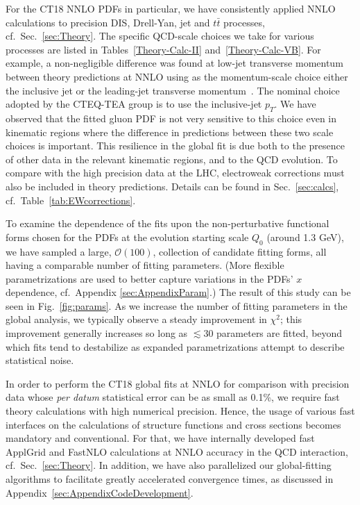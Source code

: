For the CT18 NNLO PDFs in particular, we have consistently applied NNLO calculations to precision DIS, Drell-Yan, jet and $t \bar t$ processes, cf.~Sec.~\ref{sec:Theory}. The specific QCD-scale choices
we take for various processes are listed in Tables~\ref{Theory-Calc-II} and~\ref{Theory-Calc-VB}.
%
%
For example, a non-negligible difference was found at low-jet transverse momentum between theory predictions at NNLO using as the momentum-scale choice either the inclusive jet or the
leading-jet transverse momentum~\cite{Currie:2018xkj}. The nominal choice adopted by the CTEQ-TEA group is to use the inclusive-jet $p_T$. 
We have observed that the fitted gluon PDF is not very sensitive to this choice even in kinematic regions where the difference in predictions between these two scale choices is important.
This resilience in the global fit is due both to the presence of other data in the relevant kinematic regions, and to the QCD evolution. To compare with the high precision data at the
LHC, electroweak corrections must also be included in theory predictions. Details can be found in Sec.~\ref{sec:calcs}, cf.~Table~\ref{tab:EWcorrections}.


To examine the dependence of the fits upon the non-perturbative functional forms chosen for the PDFs at the evolution starting scale $Q_0$ (around 1.3 GeV), we have sampled a large,
$\mathcal{O}(100)$, collection of candidate fitting forms, all having a comparable number of fitting parameters. (More flexible parametrizations are used to better capture variations in
the PDFs' $x$ dependence, cf.~Appendix \ref{sec:AppendixParam}.)
The result of this study can be seen in Fig.~\ref{fig:params}.
As we increase the number of fitting parameters in the global analysis,
we typically observe a steady improvement in $\chi^2$; this improvement generally
increases so long as $\lesssim\! 30$ parameters are fitted, beyond which fits tend
to destabilize as expanded parametrizations attempt to describe statistical noise.


In order to perform the CT18 global fits at NNLO for comparison with precision data whose {\it per datum} statistical error can be as small as 0.1\%, 
we require fast theory calculations with high numerical precision. 
Hence, the usage of various fast interfaces on the calculations of structure functions and cross sections becomes mandatory and conventional.
For that, we have internally developed fast ApplGrid and FastNLO calculations at NNLO accuracy in the QCD interaction, cf.~Sec.~\ref{sec:Theory}.
In addition, we have also parallelized our global-fitting algorithms to facilitate greatly accelerated convergence times, as discussed in Appendix~\ref{sec:AppendixCodeDevelopment}.


